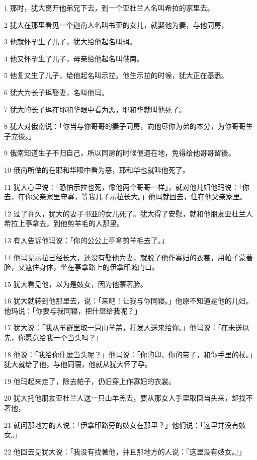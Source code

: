 \par 1 那时，犹大离开他弟兄下去，到一个亚杜兰人名叫希拉的家里去。
\par 2 犹大在那里看见一个迦南人名叫书亚的女儿，就娶他为妻，与他同房，
\par 3 他就怀孕生了儿子，犹大给他起名叫珥。
\par 4 他又怀孕生了儿子，母亲给他起名叫俄南。
\par 5 他复又生了儿子，给他起名叫示拉。他生示拉的时候，犹大正在基悉。
\par 6 犹大为长子珥娶妻，名叫他玛。
\par 7 犹大的长子珥在耶和华眼中看为恶，耶和华就叫他死了。
\par 8 犹大对俄南说：「你当与你哥哥的妻子同房，向他尽你为弟的本分，为你哥哥生子立後。」
\par 9 俄南知道生子不归自己，所以同房的时候便遗在地，免得给他哥哥留後。
\par 10 俄南所做的在耶和华眼中看为恶，耶和华也就叫他死了。
\par 11 犹大心里说：「恐怕示拉也死，像他两个哥哥一样」，就对他儿妇他玛说：「你去，在你父亲家里守寡，等我儿子示拉长大。」他玛就回去，住在他父亲家里。
\par 12 过了许久，犹大的妻子书亚的女儿死了。犹大得了安慰，就和他朋友亚杜兰人希拉上亭拿去，到他剪羊毛的人那里。
\par 13 有人告诉他玛说：「你的公公上亭拿剪羊毛去了。」
\par 14 他玛见示拉已经长大，还没有娶他为妻，就脱了他作寡妇的衣裳，用帕子蒙著脸，又遮住身体，坐在亭拿路上的伊拿印城门口。
\par 15 犹大看见他，以为是妓女，因为他蒙著脸。
\par 16 犹大就转到他那里去，说：「来吧！让我与你同寝。」他原不知道是他的儿妇。他玛说：「你要与我同寝，把什麽给我呢？」
\par 17 犹大说：「我从羊群里取一只山羊羔，打发人送来给你。」他玛说：「在未送以先，你愿意给我一个当头吗？」
\par 18 他说：「我给你什麽当头呢？」他玛说：「你的印、你的带子，和你手里的杖。」犹大就给了他，与他同寝，他就从犹大怀了孕。
\par 19 他玛起来走了，除去帕子，仍旧穿上作寡妇的衣裳。
\par 20 犹大托他朋友亚杜兰人送一只山羊羔去，要从那女人手里取回当头来，却找不著他，
\par 21 就问那地方的人说：「伊拿印路旁的妓女在那里？」他们说：「这里并没有妓女。」
\par 22 他回去见犹大说：「我没有找著他，并且那地方的人说：『这里没有妓女。』」

